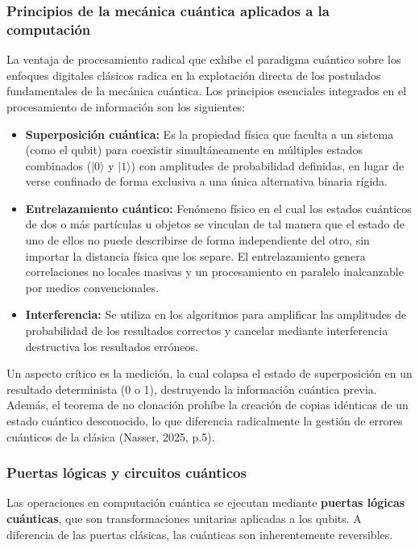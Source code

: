 \documentclass[12pt,a4paper]{article}
\begin{document}
\subsubsection{Principios de la mecánica cuántica aplicados a la computación}
La ventaja de procesamiento radical que exhibe el paradigma cuántico sobre los enfoques digitales clásicos radica en la explotación directa de los postulados fundamentales de la mecánica cuántica. Los principios esenciales integrados en el procesamiento de información son los siguientes:

\begin{itemize}
    \item \textbf{Superposición cuántica:} Es la propiedad física que faculta a un sistema (como el qubit) para coexistir simultáneamente en múltiples estados combinados ($|0\rangle$ y $|1\rangle$) con amplitudes de probabilidad definidas, en lugar de verse confinado de forma exclusiva a una única alternativa binaria rígida.
    \item \textbf{Entrelazamiento cuántico:} Fenómeno físico en el cual los estados cuánticos de dos o más partículas u objetos se vinculan de tal manera que el estado de uno de ellos no puede describirse de forma independiente del otro, sin importar la distancia física que los separe. El entrelazamiento genera correlaciones no locales masivas y un procesamiento en paralelo inalcanzable por medios convencionales.
    \item \textbf{Interferencia:} Se utiliza en los algoritmos para amplificar las amplitudes de probabilidad de los resultados correctos y cancelar mediante interferencia destructiva los resultados erróneos.
\end{itemize} 

Un aspecto crítico es la medición, la cual colapsa el estado de superposición en un resultado determinista (0 o 1), destruyendo la información cuántica previa. Además, el teorema de no clonación prohíbe la creación de copias idénticas de un estado cuántico desconocido, lo que diferencia radicalmente la gestión de errores cuánticos de la clásica (Nasser, 2025, p.5).

\subsubsection{Puertas lógicas y circuitos cuánticos}
Las operaciones en computación cuántica se ejecutan mediante \textbf{puertas lógicas cuánticas}, que son transformaciones unitarias aplicadas a los qubits. A diferencia de las puertas clásicas, las cuánticas son inherentemente reversibles.\\
\end{document}
